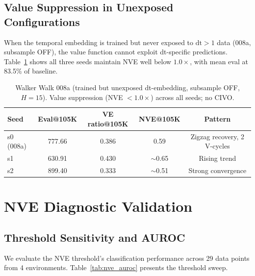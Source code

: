 \documentclass[10pt,letterpaper]{article}
\begin{document}
\subsection{Value Suppression in Unexposed Configurations}

When the temporal embedding is trained but never exposed to $\mathrm{dt}>1$ data (008a, subsample OFF), the value function cannot exploit dt-specific predictions.
Table~\ref{tab:walker_008a} shows all three seeds maintain NVE well below $1.0\times$, with mean eval at 83.5\% of baseline.

\begin{table}[h]
\centering
\caption{Walker Walk 008a (trained but unexposed dt-embedding, subsample OFF, $H=15$). Value suppression (NVE $< 1.0\times$) across all seeds; no CIVO.}
\label{tab:walker_008a}
\small
\begin{tabular}{lcccc}
\toprule
Seed & Eval@105K & VE ratio@105K & NVE@105K & Pattern \\
\midrule
s0 (008a) & 777.66 & 0.386 & 0.59 & Zigzag recovery, 2 V-cycles \\
s1 & 630.91 & 0.430 & $\sim$0.65 & Rising trend \\
s2 & 899.40 & 0.333 & $\sim$0.51 & Strong convergence \\
\bottomrule
\end{tabular}
\end{table}

\section{NVE Diagnostic Validation}

\subsection{Threshold Sensitivity and AUROC}

We evaluate the NVE threshold's classification performance across 29 data points from 4 environments.
Table~\ref{tab:nve_auroc} presents the threshold sweep.
\end{document}
